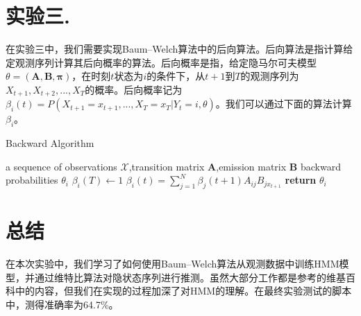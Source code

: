 \documentclass[a4paper,UTF8]{article}
\theoremstyle{definition}
\renewcommand{\algorithmicrequire}{\textbf{Input:}}
\renewcommand{\algorithmicensure}{\textbf{Procedure:}}
\begin{document}
\section*{实验三. }
	在实验三中，我们需要实现Baum–Welch算法中的后向算法。后向算法是指计算给定观测序列计算其后向概率的算法。后向概率是指，给定隐马尔可夫模型$\theta=(\mathbf{A},\mathbf{B},\mathbf{\pi})$，在时刻$t$状态为$i$的条件下，从$t+1$到$T$的观测序列为$X_{t+1},X_{t+2},...,X_{T}$的概率。后向概率记为
$\beta_i(t)=P(X_{t+1}=x_{t+1},...,X_T=x_T|Y_t=i,\theta)$。我们可以通过下面的算法计算$\beta_i$\cite{reference3}。

\begin{algorithm}
	\renewcommand{\algorithmicrequire}{\textbf{Input:}}
	\renewcommand{\algorithmicensure}{\textbf{Output:}}
	\caption{Backward Algorithm}
	\label{alg:1}
	\begin{algorithmic}[1]
		\REQUIRE a sequence of observations $\mathcal{X}$,transition matrix $\textbf{A}$,emission matrix $\textbf{B}$
		\ENSURE backward probabilities $\theta_i$
		\STATE $\beta_i (T) \gets 1$
		\STATE $\beta_i(t)=\sum_{j=1}^N\beta_j(t+1)A_{ij}B_{jx_{t+1}}$
		\ENDFOR
		\STATE \textbf{return} $\theta_i$
\end{algorithmic}  
\end{algorithm}

\section*{总结}
	在本次实验中，我们学习了如何使用Baum–Welch算法从观测数据中训练HMM模型，并通过维特比算法对隐状态序列进行推测。虽然大部分工作都是参考的维基百科中的内容，但我们在实现的过程加深了对HMM的理解。在最终实验测试的脚本中，测得准确率为64.7\%。



\end{document}
